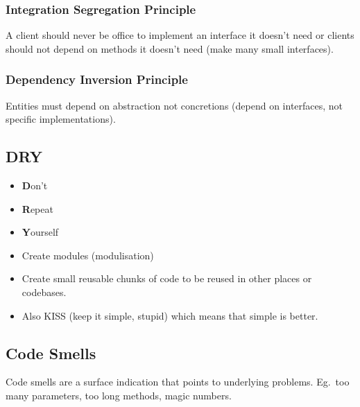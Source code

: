 \subsubsection{Integration Segregation Principle}\label{ssub:integration_segregation_principle}

A client should never be office to implement an interface it doesn't need or clients should not depend on methods it doesn't need (make many small interfaces).

\subsubsection{Dependency Inversion Principle}\label{ssub:dependency_inversion_principle}

Entities must depend on abstraction not concretions (depend on interfaces, not specific implementations).

\subsection{DRY}\label{sub:dry}

\begin{itemize}
    \item \textbf{D}on't
    \item \textbf{R}epeat
    \item \textbf{Y}ourself
\end{itemize}

\begin{itemize}
    \item Create modules (modulisation)
    \item Create small reusable chunks of code to be reused in other places or codebases.
    \item Also KISS (keep it simple, stupid) which means that simple is better.
\end{itemize}

\subsection{Code Smells}\label{sub:code_smells}

Code smells are a surface indication that points to underlying problems.
Eg.\ too many parameters, too long methods, magic numbers.
